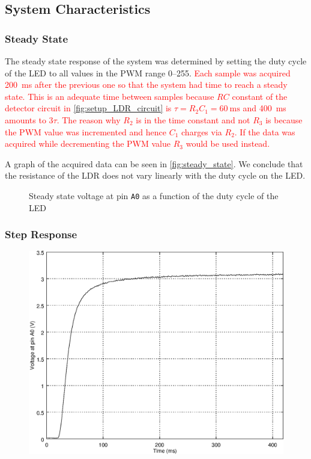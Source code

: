 \subsection{System Characteristics}
\label{sec:SystemCharacteristics}

\subsubsection{Steady State}
\label{sub:SteadyState}

The steady state response of the system was determined by setting the duty cycle of the LED to all values in the PWM range 0--255. \textcolor{red}{Each sample was acquired \SI{200}{\milli\second} after the previous one so that the system had time to reach a steady state. This is an adequate time between samples because $RC$ constant of the detector circuit in \autoref{fig:setup_LDR_circuit} is $\tau = R_2C_1 = \SI{60}{\milli\second}$ and \SI{400}{\milli\second} amounts to $3\tau$. The reason why $R_2$ is in the time constant and not $R_3$ is because the PWM value was incremented and hence $C_1$ charges via $R_2$. If the data was acquired while decrementing the PWM value $R_3$ would be used instead.}


A graph of the acquired data can be seen in \autoref{fig:steady_state}. We conclude that the resistance of the LDR does not vary linearly with the duty cycle on the LED.

\begin{figure}[h]
    \centering
    \resizebox{\textwidth}{!}{}
    \caption{Steady state voltage at pin \texttt{A0} as a function of the duty cycle of the LED}
    \label{fig:steady_state}
\end{figure}

\subsubsection{Step Response}
\label{sub:StepResponse}

\begin{figure}[h]
    \centering
    \includegraphics[width=.85\textwidth]{img/step_response}
    \caption{}
    \label{fig:step_response}
\end{figure}

